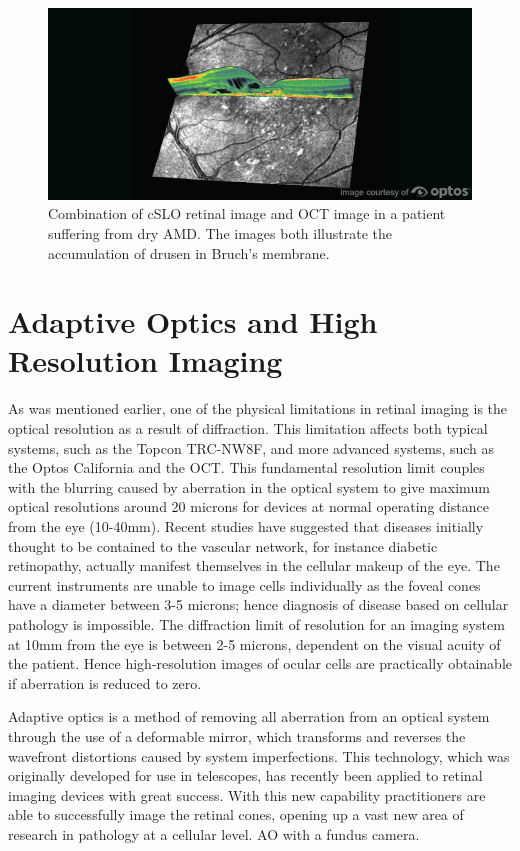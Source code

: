 \begin{figure}[htbp]
\centering
\includegraphics{figures/multi}
\caption{Combination of cSLO retinal image and OCT image in a patient suffering from
dry AMD. The images both illustrate the accumulation of drusen in Bruch’s membrane.}
\label{fig:multi}
\end{figure}

\section{Adaptive Optics and High Resolution Imaging}


As was mentioned earlier, one of the physical limitations in retinal imaging is
the optical resolution as a result of diffraction. This limitation affects both
typical systems, such as the Topcon TRC-NW8F, and more advanced systems, such as
the Optos California and the OCT. This fundamental resolution limit couples with
the blurring caused by aberration in the optical system to give maximum optical
resolutions around 20 microns for devices at normal operating distance from the
eye (10-40mm). Recent studies \cite{barber2003new} have suggested that diseases
initially thought to be contained to the vascular network, for instance diabetic
retinopathy, actually manifest themselves in the cellular makeup of the eye. The
current instruments are unable to image cells individually as the foveal cones
have a diameter between 3-5 microns; hence diagnosis of disease based on cellular
pathology is impossible. The diffraction limit of resolution for an imaging system
at 10mm from the eye is between 2-5 microns, dependent on the visual acuity of the
patient. Hence high-resolution images of ocular cells are practically obtainable
if aberration is reduced to zero.
 
Adaptive optics is a method of removing all aberration from an optical system
through the use of a deformable mirror, which transforms and reverses the wavefront
distortions caused by system imperfections. This technology, which was originally
developed for use in telescopes, has recently been applied to retinal imaging
devices with great success. \cite{zhang2006high} With this new capability
practitioners are able to successfully image the retinal cones, opening up a vast
new area of research in pathology at a cellular level. %
AO with a fundus camera.

